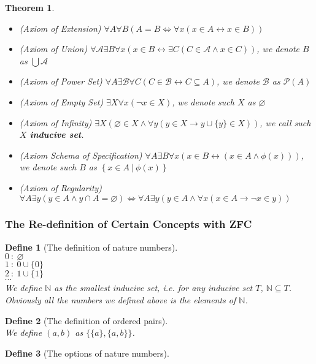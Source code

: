 \documentclass{ctexart}
\newcommand{\。}{．} %
\newcommand{\NN}{\mathbb{N}} %
\newenvironment{lvse}{
    \begin{tcolorbox}[enhanced, breakable, colback=qlv, boxrule=0pt, frame hidden,
        borderline west={0.7mm}{0.1mm}{slv}]
    }
    {\end{tcolorbox}}
\newenvironment{huangse}{
    \begin{tcolorbox}[enhanced, breakable, colback=qhuang, boxrule=0pt, frame hidden,
        borderline west={0.7mm}{0.1mm}{shuang}]
    }
    {\end{tcolorbox}}
\theoremstyle{t} %
\newtheorem{dyhj}{\color{slv} Define}[subsection] %
\newtheorem{dlhj}{\color{shuang} Theorem}[subsection]
\newenvironment{dy}{\begin{lvse}\begin{dyhj}}{\end{dyhj}\end{lvse}}
\newenvironment{dl}{\begin{huangse}\begin{dlhj}}{\end{dlhj}\end{huangse}}
\begin{document}
\begin{dl}\quad
    \begin{itemize}
        \item (Axiom of Extension) $\forall A \forall B (A = B \Leftrightarrow \forall x (x \in A \leftrightarrow x \in B))$
        \item (Axiom of Union) $\forall \mathcal{A} \exists B \forall x (x \in B \leftrightarrow \exists C (C \in \mathcal{A} \land x \in C))$, we denote $B$ as $\bigcup \mathcal{A}$
        \item (Axiom of Power Set) $\forall A \exists \mathcal{B} \forall C(C \in \mathcal{B} \leftrightarrow C \subseteq A)$, we denote $\mathcal{B}$ as $\mathcal{P}(A)$
        \item (Axiom of Empty Set) $\exists X \forall x(\lnot x \in X)$, we denote such $X$ as $\varnothing$
        \item (Axiom of Infinity) $\exists X(\varnothing \in X \land \forall y(y \in X \rightarrow y \cup \{y\} \in X))$, we call such $X$ \textbf{inducive set}.
        \item (Axiom Schema of Specification) $\forall A \exists B \forall x (x \in B \leftrightarrow (x \in A \land \phi(x)))$, we denote such $B$ as $\left\{x \in A\ |\ \phi(x)\right\}$
        \item (Axiom of Regularity) $\forall A \exists y(y \in A \land y \cap A = \varnothing) \Leftrightarrow \forall A \exists y(y \in A \land \forall x (x \in A \rightarrow \lnot x \in y))$
    \end{itemize}
\end{dl}

\subsubsection{The Re-definition of Certain Concepts with ZFC}

\begin{dy}[The definition of nature numbers]\quad \\
    $0\ :\ \varnothing$ \\
    $1\ :\ 0 \cup \{0\}$ \\
    $2\ :\ 1 \cup \{1\}$ \\
    $\cdots$ \\
    We define $\NN$ as the smallest inducive set, i.e. for any inducive set $T$, $\NN \subseteq T$. \\
    Obviously all the numbers we defined above is the elements of $\NN$.
\end{dy}

\begin{dy}[The definition of ordered pairs]\quad \\
    We define $(a, b)$ as $\{\{a\}, \{a, b\}\}$.
\end{dy}

\begin{dy}[The options of nature numbers]
    
\end{dy}
\end{document}
